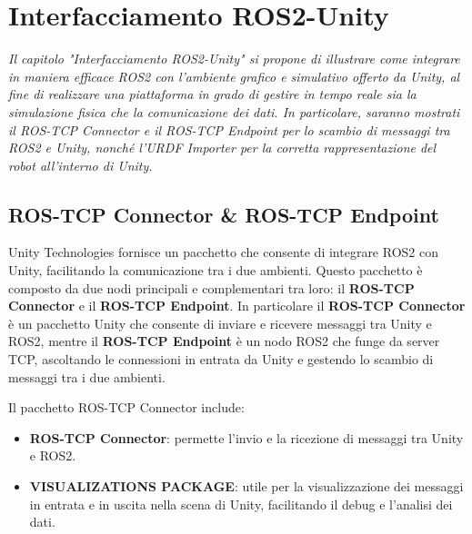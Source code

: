 \documentclass[11pt]{report}
\begin{document}
\section{Interfacciamento ROS2-Unity}
\label{sec:interfacciamento_ros2_unity}
\textit{Il capitolo "Interfacciamento ROS2-Unity" si propone di illustrare come integrare in maniera efficace ROS2 con l’ambiente grafico e simulativo offerto da Unity, al fine di realizzare una piattaforma in grado di gestire in tempo reale sia la simulazione fisica che la comunicazione dei dati. In particolare, saranno mostrati il ROS-TCP Connector e il ROS-TCP Endpoint per lo scambio di messaggi tra ROS2 e Unity, nonché l'URDF Importer per la corretta rappresentazione del robot all'interno di Unity.}

\subsection{ROS-TCP Connector \& ROS-TCP Endpoint}
Unity Technologies fornisce un pacchetto che consente di integrare ROS2 con Unity, facilitando la comunicazione tra i due ambienti. Questo pacchetto è composto da due nodi principali e complementari tra loro: il \textbf{ROS-TCP Connector} e il \textbf{ROS-TCP Endpoint}.
In particolare il \textbf{ROS-TCP Connector} è un pacchetto Unity che consente di inviare e ricevere messaggi tra Unity e ROS2, mentre il \textbf{ROS-TCP Endpoint} è un nodo ROS2 che funge da server TCP, ascoltando le connessioni in entrata da Unity e gestendo lo scambio di messaggi tra i due ambienti.
\newline

Il pacchetto ROS-TCP Connector include:

\begin{itemize}
    \item \textbf{ROS-TCP Connector}: permette l’invio e la ricezione di messaggi tra Unity e ROS2.
    \item \textbf{VISUALIZATIONS PACKAGE}: utile per la visualizzazione dei messaggi in entrata e in uscita nella scena di Unity, facilitando il debug e l'analisi dei dati.
\end{itemize}
\end{document}
